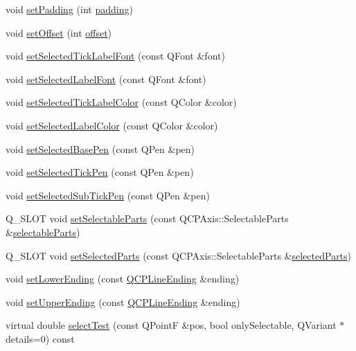 \begin{DoxyCompactItemize}
void \hyperlink{class_q_c_p_axis_a5691441cb3de9e9844855d339c0db279}{set\+Padding} (int \hyperlink{class_q_c_p_axis_abb85015a9467ec176e70698307ec833a}{padding})
\item 
void \hyperlink{class_q_c_p_axis_a04a652603cbe50eba9969ee6d68873c3}{set\+Offset} (int \hyperlink{class_q_c_p_axis_aebc032ac6eea164a02859c017f52d5e7}{offset})
\item 
void \hyperlink{class_q_c_p_axis_a845ccb560b7bc5281098a5be494145f6}{set\+Selected\+Tick\+Label\+Font} (const Q\+Font \&font)
\item 
void \hyperlink{class_q_c_p_axis_a02ec2a75d4d8401eaab834fbc6803d30}{set\+Selected\+Label\+Font} (const Q\+Font \&font)
\item 
void \hyperlink{class_q_c_p_axis_a9bdbf5e63ab15187f3a1de9440129227}{set\+Selected\+Tick\+Label\+Color} (const Q\+Color \&color)
\item 
void \hyperlink{class_q_c_p_axis_a5d502dec597c634f491fdd73d151c72d}{set\+Selected\+Label\+Color} (const Q\+Color \&color)
\item 
void \hyperlink{class_q_c_p_axis_aeb917a909215605b95ef2be843de1ee8}{set\+Selected\+Base\+Pen} (const Q\+Pen \&pen)
\item 
void \hyperlink{class_q_c_p_axis_a8360502685eb782edbf04019c9345cdc}{set\+Selected\+Tick\+Pen} (const Q\+Pen \&pen)
\item 
void \hyperlink{class_q_c_p_axis_a2a00a7166600155eac26843132eb9576}{set\+Selected\+Sub\+Tick\+Pen} (const Q\+Pen \&pen)
\item 
Q\+\_\+\+S\+L\+O\+T void \hyperlink{class_q_c_p_axis_a513f9b9e326c505d9bec54880031b085}{set\+Selectable\+Parts} (const Q\+C\+P\+Axis\+::\+Selectable\+Parts \&\hyperlink{class_q_c_p_axis_ad2bff3d2ed3d35c10d44c0c02441bd2c}{selectable\+Parts})
\item 
Q\+\_\+\+S\+L\+O\+T void \hyperlink{class_q_c_p_axis_ab9d7a69277dcbed9119b3c1f25ca19c3}{set\+Selected\+Parts} (const Q\+C\+P\+Axis\+::\+Selectable\+Parts \&\hyperlink{class_q_c_p_axis_a08323248a1cba4750ef07ceea159e0b3}{selected\+Parts})
\item 
void \hyperlink{class_q_c_p_axis_a08af1c72db9ae4dc8cb8a973d44405ab}{set\+Lower\+Ending} (const \hyperlink{class_q_c_p_line_ending}{Q\+C\+P\+Line\+Ending} \&ending)
\item 
void \hyperlink{class_q_c_p_axis_a69119b892fc306f651763596685aa377}{set\+Upper\+Ending} (const \hyperlink{class_q_c_p_line_ending}{Q\+C\+P\+Line\+Ending} \&ending)
\item 
virtual double \hyperlink{class_q_c_p_axis_a2877a6230920c118be65c6113089f467}{select\+Test} (const Q\+Point\+F \&pos, bool only\+Selectable, Q\+Variant $\ast$details=0) const 

\end{DoxyCompactItemize}

